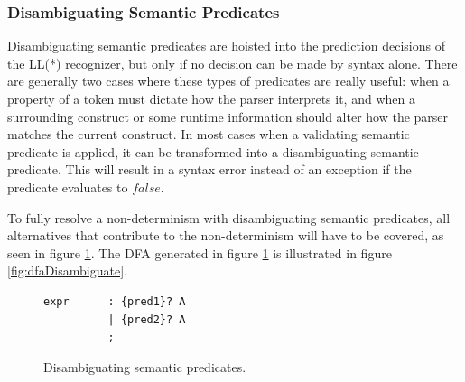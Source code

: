 \subsubsection{Disambiguating Semantic Predicates}
Disambiguating semantic predicates are hoisted into the prediction decisions of the LL(*) recognizer, but only if no decision can be made by syntax alone. There are generally two cases where these types of predicates are really useful: when a property of a token must dictate how the parser interprets it, and when a surrounding construct or some runtime information should alter how the parser matches the current construct. In most cases when a validating semantic predicate is applied, it can be transformed into a disambiguating semantic predicate. This will result in a syntax error instead of an exception if the predicate evaluates to $false$.

To fully resolve a non-determinism with disambiguating semantic predicates, all alternatives that contribute to the non-determinism will have to be covered, as seen in figure \ref{code:disambigSemantic}. The DFA generated in figure \ref{code:disambigSemantic} is illustrated in figure \ref{fig:dfaDisambiguate}.

\begin{figure}[h!]
\begin{verbatim}
expr      : {pred1}? A 
          | {pred2}? A
          ;
\end{verbatim}
\caption{Disambiguating semantic predicates.}
\label{code:disambigSemantic}
\end{figure}

